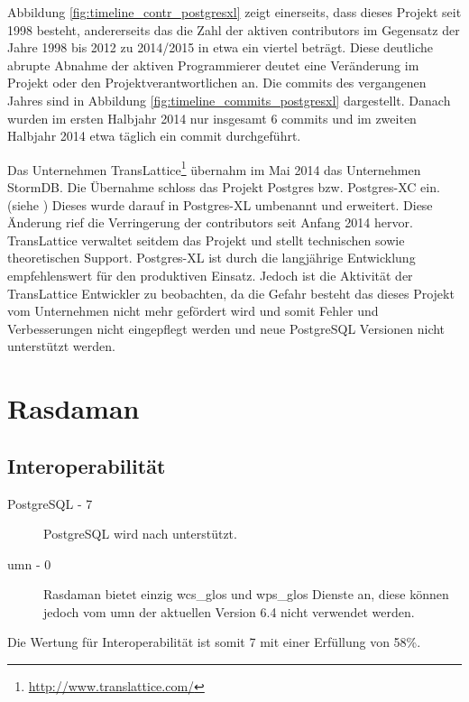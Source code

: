 Abbildung \ref{fig:timeline_contr_postgresxl} zeigt einerseits, dass dieses Projekt seit 1998 besteht, andererseits das die Zahl der aktiven contributors im Gegensatz der Jahre 1998 bis 2012 zu 2014/2015 in etwa ein viertel beträgt.
Diese deutliche abrupte Abnahme der aktiven Programmierer deutet eine Veränderung im Projekt oder den Projektverantwortlichen an.
Die commits des vergangenen Jahres sind in Abbildung \ref{fig:timeline_commits_postgresxl} dargestellt.
Danach wurden im ersten Halbjahr 2014 nur insgesamt 6 commits und im zweiten Halbjahr 2014 etwa täglich ein commit durchgeführt.

Das Unternehmen TransLattice\footnote{\url{http://www.translattice.com/}} übernahm im Mai 2014 das Unternehmen StormDB.
Die Übernahme schloss das Projekt Postgres bzw. Postgres-XC ein. (siehe \cite{website:translattice-stormdb})
Dieses wurde darauf in Postgres-XL umbenannt und erweitert.
Diese Änderung rief die Verringerung der contributors seit Anfang 2014 hervor.
TransLattice verwaltet seitdem das Projekt und stellt technischen sowie theoretischen Support.
Postgres-XL ist durch die langjährige Entwicklung empfehlenswert für den produktiven Einsatz.
Jedoch ist die Aktivität der TransLattice Entwickler zu beobachten, da die Gefahr besteht das dieses Projekt vom Unternehmen nicht mehr gefördert wird und somit Fehler und Verbesserungen nicht eingepflegt werden und neue PostgreSQL Versionen nicht unterstützt werden.


\section{Rasdaman}

\subsection{Interoperabilität}
\begin{description}
\item[PostgreSQL - 7] PostgreSQL wird nach \cite{website:rasdaman-features} unterstützt.
\item[\Gls{umn} - 0] Rasdaman bietet einzig \Gls{wcs_glos} und \Gls{wps_glos} Dienste an, diese können jedoch vom \Gls{umn} der aktuellen Version 6.4 nicht verwendet werden.
\end{description}
Die Wertung für Interoperabilität ist somit 7 mit einer Erfüllung von 58\%.

